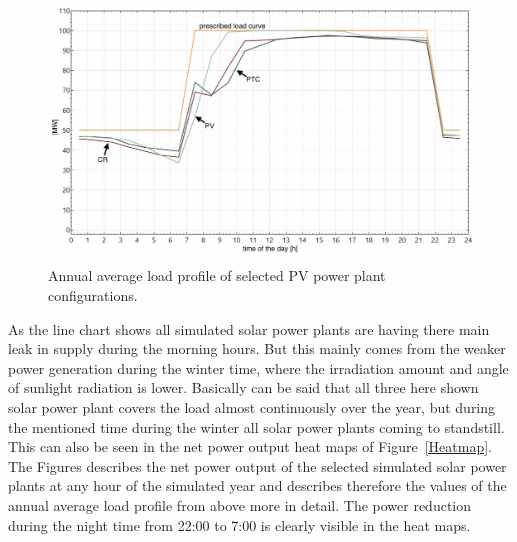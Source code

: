 \begin{figure}[htbp]  
\centering
\includegraphics[width=0.8\linewidth]{FIG/90_annual_profil}
\caption[Annual average load profile of selected PV power plant configurations.]{Annual average load profile of selected PV power plant configurations.}\label{90_annual_profil}
\end{figure}
As the line chart shows all simulated solar power plants are having there main leak in supply during the morning hours. But this mainly comes from the weaker power generation during the winter time, where the irradiation amount and angle of sunlight radiation is lower. Basically can be said that all three here shown solar power plant covers the load almost continuously over the year, but during the mentioned time during the winter all solar power plants coming to standstill. This can also be seen in the net power output heat maps of Figure~\ref{Heatmap}. The Figures describes the net power output of the selected simulated solar power plants at any hour of the simulated year and describes therefore the values of the annual average load profile from above more in detail. The power reduction during the night time from 22:00 to 7:00 is clearly visible in the heat maps. 

